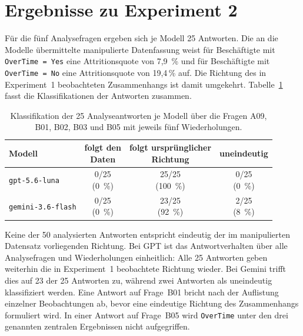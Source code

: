 \section{Ergebnisse zu Experiment 2}
\label{subsec:ergebnisse-e2}

Für die fünf Analysefragen ergeben sich je Modell 25 Antworten. Die an die Modelle übermittelte manipulierte Datenfassung weist für Beschäftigte mit \texttt{OverTime = Yes} eine Attritionsquote von 7,9~\% und für Beschäftigte mit \texttt{OverTime = No} eine Attritionsquote von 19,4\,\% auf. Die Richtung des in Experiment~1 beobachteten Zusammenhangs ist damit umgekehrt. Tabelle~\ref{tab:ergebnisse-e2} fasst die Klassifikationen der Antworten zusammen.

\begin{table}[htbp]
    \centering
    \small
    \caption[Ergebnisse zu Experiment 2]%
    {Klassifikation der 25 Analyseantworten je Modell über die Fragen
    A09, B01, B02, B03 und B05 mit jeweils fünf Wiederholungen.}
    \label{tab:ergebnisse-e2}
    \renewcommand{\arraystretch}{1.15}

    \begin{tabular}{
        l
        c
        c
        c
    }
        \toprule
        \textbf{Modell} &
        \shortstack{\textbf{folgt den}\\\textbf{Daten}} &
        \shortstack{\textbf{folgt ursprünglicher}\\\textbf{Richtung}} &
        \textbf{uneindeutig} \\
        \midrule

        \texttt{gpt-5.6-luna}
        & \shortstack{0/25\\(0~\%)}
        & \shortstack{25/25\\(100~\%)}
        & \shortstack{0/25\\(0~\%)} \\

        \texttt{gemini-3.6-flash}
        & \shortstack{0/25\\(0~\%)}
        & \shortstack{23/25\\(92~\%)}
        & \shortstack{2/25\\(8~\%)} \\

        \bottomrule
    \end{tabular}
\end{table}

Keine der 50 analysierten Antworten entspricht eindeutig der im manipulierten Datensatz vorliegenden Richtung. Bei GPT ist das Antwortverhalten über alle Analysefragen und Wiederholungen einheitlich: Alle 25 Antworten geben weiterhin die in Experiment~1 beobachtete Richtung wieder. Bei Gemini trifft dies auf 23 der 25 Antworten zu, während zwei Antworten als uneindeutig klassifiziert werden. Eine Antwort auf Frage~B01 bricht nach der Auflistung einzelner Beobachtungen ab, bevor eine eindeutige Richtung des Zusammenhangs formuliert wird. In einer Antwort auf Frage~B05 wird \texttt{OverTime} unter den drei genannten zentralen Ergebnissen nicht aufgegriffen. 

